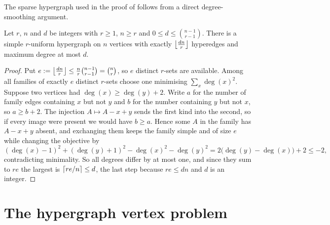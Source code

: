 The sparse hypergraph used in the proof of 
follows from a direct degree-smoothing argument.

\begin{lemma}\label{lem:sparse-hypergraph}
Let $r$, $n$ and $d$ be integers with $r \ge 1$, $n \ge r$ and $0 \le d \le \binom{n-1}{r-1}$. There is a simple
$r$-uniform hypergraph on $n$ vertices with exactly $\left\lfloor \frac{dn}{r} \right\rfloor$
hyperedges and maximum degree at most $d$.
\end{lemma}

\begin{proof}
Put $e := \left\lfloor \frac{dn}{r} \right\rfloor \le \frac{n}{r}\binom{n-1}{r-1} = \binom{n}{r}$, so
$e$ distinct $r$-sets are available. Among all families of exactly $e$ distinct
$r$-sets choose one minimising $\sum_x \deg(x)^2$. Suppose two vertices had
$\deg(x) \ge \deg(y) + 2$. Write $a$ for the number of family edges containing
$x$ but not $y$ and $b$ for the number containing $y$ but not $x$, so
$a \ge b + 2$. The injection $A \mapsto A - x + y$ sends the first kind into the
second, so if every image were present we would have $b \ge a$. Hence some $A$
in the family has $A - x + y$ absent, and exchanging them keeps the family
simple and of size $e$ while changing the objective by
\[
(\deg(x)-1)^2 + (\deg(y)+1)^2 - \deg(x)^2 - \deg(y)^2
 = 2\bigl(\deg(y) - \deg(x)\bigr) + 2 \le -2,
\]
contradicting minimality. So all degrees differ by at most one, and since they
sum to $re$ the largest is $\left\lceil re/n \right\rceil \le d$, the last step because
$re \le dn$ and $d$ is an integer.
\end{proof}

\section{The hypergraph vertex problem}\label{sec:hyper-vertex-proof}

